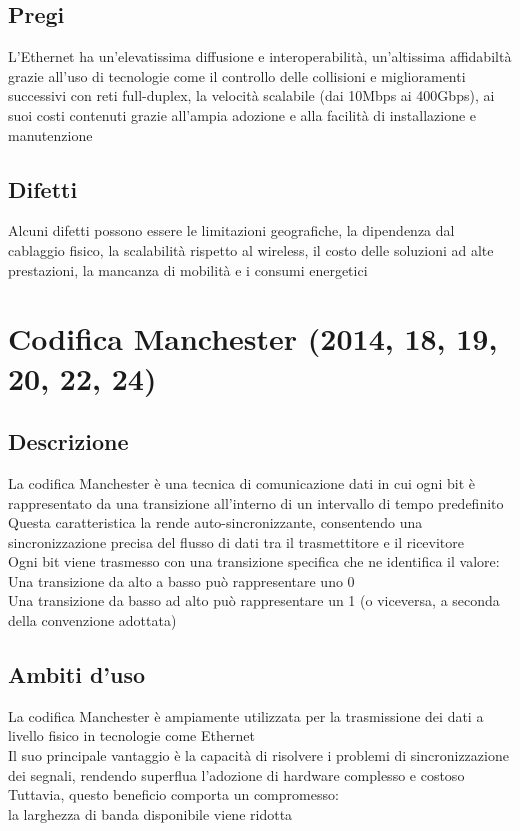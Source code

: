 \documentclass[10pt,oneside,a4paper]{article}
\begin{document}
\subsection{Pregi}
L'Ethernet ha un'elevatissima diffusione e interoperabilità, un'altissima affidabiltà grazie all'uso di tecnologie come il controllo delle collisioni e miglioramenti successivi con reti full-duplex, la velocità scalabile (dai 10Mbps ai 400Gbps), ai suoi costi contenuti grazie all'ampia adozione e alla facilità di installazione e manutenzione
\subsection{Difetti}
Alcuni difetti possono essere le limitazioni geografiche, la dipendenza dal cablaggio fisico, la scalabilità rispetto al wireless, il costo delle soluzioni ad alte prestazioni, la mancanza di mobilità e i consumi energetici
\section{Codifica Manchester (2014, 18, 19, 20, 22, 24)}
\subsection{Descrizione} La codifica Manchester è una tecnica di comunicazione dati in cui ogni bit è rappresentato da una transizione all'interno di un intervallo di tempo predefinito\\
Questa caratteristica la rende auto-sincronizzante, consentendo una sincronizzazione precisa del flusso di dati tra il trasmettitore e il ricevitore\\
Ogni bit viene trasmesso con una transizione specifica che ne identifica il valore:\\
Una transizione da alto a basso può rappresentare uno 0\\
Una transizione da basso ad alto può rappresentare un 1 (o viceversa, a seconda della convenzione adottata)
\subsection{Ambiti d'uso}
La codifica Manchester è ampiamente utilizzata per la trasmissione dei dati a livello fisico in tecnologie come Ethernet\\
Il suo principale vantaggio è la capacità di risolvere i problemi di sincronizzazione dei segnali, rendendo superflua l’adozione di hardware complesso e costoso\\
Tuttavia, questo beneficio comporta un compromesso:\\
la larghezza di banda disponibile viene ridotta
\end{document}
